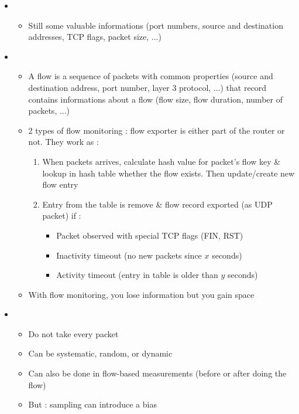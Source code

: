\begin{itemize}
    \item {}
    \begin{itemize}
        \item Still some valuable informations (port numbers, source and destination addresses, TCP flags, packet size, ...)
    \end{itemize}
    \item {}
    \begin{itemize}
        \item A flow is a sequence of packets with common properties (source and destination address, port number, layer 3 protocol, ...) that record contains informations about a flow (flow size, flow duration, number of packets, ...)
        \item 2 types of flow monitoring : flow exporter is either part of the router or not. They work as :
        \begin{enumerate}
            \item When packets arrives, calculate hash value for packet's flow key \& lookup in hash table whether the flow exists. Then update/create new flow entry
            \item Entry from the table is remove \& flow record exported (as UDP packet) if :
            \begin{itemize}
                \item Packet observed with special TCP flags (FIN, RST)
                \item Inactivity timeout (no new packets since $x$ seconds)
                \item Activity timeout (entry in table is older than $y$ seconds)
            \end{itemize}
        \end{enumerate}
        \item With flow monitoring, you lose information but you gain space
    \end{itemize}
    \item {}
    \begin{itemize}
        \item Do not take every packet
        \item Can be systematic, random, or dynamic
        \item Can also be done in flow-based measurements (before or after doing the flow)
        \item But : sampling can introduce a bias
    \end{itemize}
\end{itemize}

